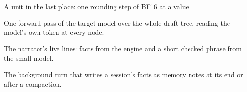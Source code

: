 \begin{description}[style=unboxed, leftmargin=0pt, itemsep=.5ex, font=\normalfont\bfseries]
\item[ulp] A unit in the last place: one rounding step of BF16 at a value.

\item[verify] One forward pass of the target model over the whole draft tree, reading the model's own token at every node.

\item[voice] The narrator's live lines: facts from the engine and a short checked phrase from the small model.

\item[writer] The background turn that writes a session's facts as memory notes at its end or after a compaction.

\end{description}

